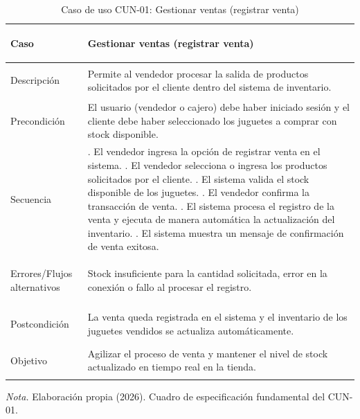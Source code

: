 \begin{table}[H]
  \centering
  \caption{Caso de uso CUN-01: Gestionar ventas (registrar venta)}
  \label{tab:cun_01}
  {\small
  \setlength{\tabcolsep}{4pt}
  \renewcommand{\arraystretch}{1.05}
  \begin{tabularx}{\textwidth}{|>{\bfseries\raggedright\arraybackslash}p{3.2cm}|>{\raggedright\arraybackslash}X|}
    \hline
    Caso & Gestionar ventas (registrar venta) \\
    \hline
    Descripción & Permite al vendedor procesar la salida de productos solicitados por el cliente dentro del sistema de inventario. \\
    \hline
    Precondición & El usuario (vendedor o cajero) debe haber iniciado sesión y el cliente debe haber seleccionado los juguetes a comprar con stock disponible. \\
    \hline
    Secuencia &
    1. El vendedor ingresa la opción de registrar venta en el sistema. \newline
    2. El vendedor selecciona o ingresa los productos solicitados por el cliente. \newline
    3. El sistema valida el stock disponible de los juguetes. \newline
    4. El vendedor confirma la transacción de venta. \newline
    5. El sistema procesa el registro de la venta y ejecuta de manera automática la actualización del inventario. \newline
    6. El sistema muestra un mensaje de confirmación de venta exitosa. \\
    \hline
    Errores/Flujos alternativos & Stock insuficiente para la cantidad solicitada, error en la conexión o fallo al procesar el registro. \\
    \hline
    Postcondición & La venta queda registrada en el sistema y el inventario de los juguetes vendidos se actualiza automáticamente. \\
    \hline
    Objetivo & Agilizar el proceso de venta y mantener el nivel de stock actualizado en tiempo real en la tienda. \\
    \hline
  \end{tabularx}}
  \par\vspace{0.2ex}
  \raggedright\noindent\small \emph{Nota.} Elaboración propia (2026). Cuadro de especificación fundamental del CUN-01.
\end{table}

